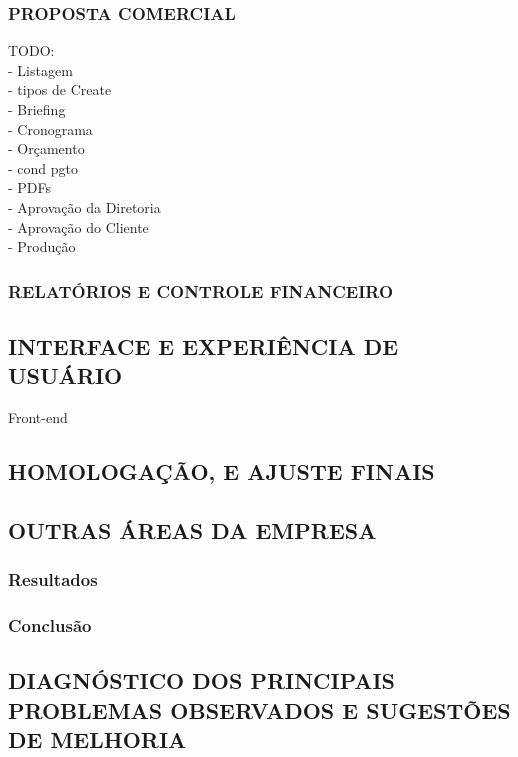 \documentclass[
  12pt,				%
  openany,
  oneside,
  a4paper,			%
  english,			%
  brazil
]{article}
\numberwithin{figure}{section}
\numberwithin{table}{section}
\begin{document}
  
  \subsubsection{PROPOSTA COMERCIAL}
  \noindent TODO: \\
  - Listagem \\
  - tipos de Create \\
  - Briefing \\
  - Cronograma \\
  - Orçamento \\
  - cond pgto \\
  - PDFs \\
  - Aprovação da Diretoria \\
  - Aprovação do Cliente \\
  - Produção
  
  
  
  \subsubsection{RELATÓRIOS E CONTROLE FINANCEIRO}


\subsection{INTERFACE E EXPERIÊNCIA DE USUÁRIO}

  \noindent
  Front-end

\subsection{HOMOLOGAÇÃO, E AJUSTE FINAIS}

\subsection{OUTRAS ÁREAS DA EMPRESA}



\subsubsection{Resultados}
\subsubsection{Conclusão}



\subsection{DIAGNÓSTICO DOS PRINCIPAIS PROBLEMAS OBSERVADOS E SUGESTÕES DE MELHORIA}
\end{document}
